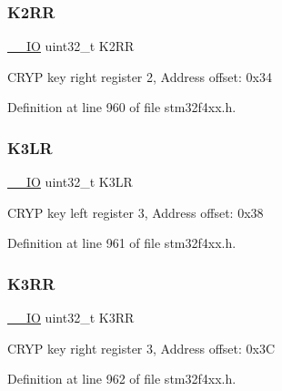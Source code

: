 \subsubsection{\texorpdfstring{K2\+RR}{K2RR}}
{\footnotesize\ttfamily \hyperlink{group___c_m_s_i_s__core__definitions_gaec43007d9998a0a0e01faede4133d6be}{\+\_\+\+\_\+\+IO} uint32\+\_\+t K2\+RR}

C\+R\+YP key right register 2, Address offset\+: 0x34 

Definition at line 960 of file stm32f4xx.\+h.

\mbox{\label{struct_c_r_y_p___type_def_a516c328fcb53ec754384e584caf890f5}} 
\subsubsection{\texorpdfstring{K3\+LR}{K3LR}}
{\footnotesize\ttfamily \hyperlink{group___c_m_s_i_s__core__definitions_gaec43007d9998a0a0e01faede4133d6be}{\+\_\+\+\_\+\+IO} uint32\+\_\+t K3\+LR}

C\+R\+YP key left register 3, Address offset\+: 0x38 

Definition at line 961 of file stm32f4xx.\+h.

\mbox{\label{struct_c_r_y_p___type_def_a8fe249258f1733ec155c3893375c7a21}} 
\subsubsection{\texorpdfstring{K3\+RR}{K3RR}}
{\footnotesize\ttfamily \hyperlink{group___c_m_s_i_s__core__definitions_gaec43007d9998a0a0e01faede4133d6be}{\+\_\+\+\_\+\+IO} uint32\+\_\+t K3\+RR}

C\+R\+YP key right register 3, Address offset\+: 0x3C 

Definition at line 962 of file stm32f4xx.\+h.

\mbox{\label{struct_c_r_y_p___type_def_a524e134cec519206cb41d0545e382978}} 
